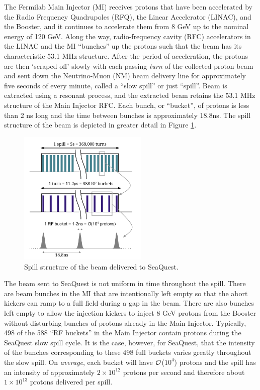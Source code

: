 The Fermilab Main Injector (MI) receives protons that have been accelerated by the Radio Frequency Quadrupoles (RFQ), the Linear Accelerator (LINAC), and the Booster, and it continues to accelerate them from 8 GeV up to the nominal energy of 120 GeV. Along the way, radio-frequency cavity (RFC) accelerators in the LINAC and the MI ``bunches'' up the protons such that the beam has its characteristic 53.1 MHz structure. After the period of acceleration, the protons are then `scraped off' slowly with each passing \emph{turn} of the collected proton beam and sent down the Neutrino-Muon (NM) beam delivery line for approximately five seconds of every minute, called a ``slow spill'' or just ``spill''. Beam is extracted using a resonant process, and the extracted beam retains the 53.1 MHz structure of the Main Injector RFC. Each bunch, or ``bucket'', of protons is less than 2 ns long and the time between bunches is approximately 18.8ns. The spill structure of the beam is depicted in greater detail in Figure \ref{fig:SpillStructure}.

\begin{figure}
	\begin{center}
		\includegraphics[width=0.55\textwidth]{figures/apparatus/SpillStructure.pdf}
		\caption{Spill structure of the beam delivered to SeaQuest.}
		\label{fig:SpillStructure}
	\end{center}
\end{figure}

The beam sent to SeaQuest is not uniform in time throughout the spill.  There are beam bunches in the MI that are intentionally left empty so that the abort kickers can ramp to a full field during a gap in the beam. There are also bunches left empty to allow the injection kickers to inject 8 GeV protons from the Booster without disturbing bunches of protons already in the Main Injector.  Typically, 498 of the 588 ``RF buckets'' in the Main Injector contain protons during the SeaQuest slow spill cycle.  It is the case, however, for SeaQuest, that the intensity of the bunches corresponding to these 498 full buckets varies greatly throughout the slow spill. On \emph{average}, each bucket will have \emph{$\mathcal{O}$}($10^4$) protons and the spill has an intensity of approximately $2\times 10^{12}$ protons per second and therefore about $1\times 10^{13}$ protons delivered per spill.

